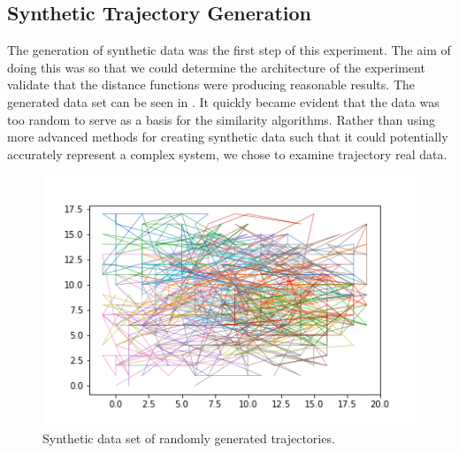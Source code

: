 



\subsection{Synthetic Trajectory Generation}



The generation of synthetic data was the first step of this experiment. 
The aim of doing this  was so that we could determine the architecture of the experiment validate that the distance functions were producing reasonable results.  
The generated data set can be seen in . 
It quickly became evident that the data was too random to serve as a basis for the similarity algorithms.
Rather than using more advanced methods for creating synthetic data such that it could potentially accurately represent a complex system, we chose to examine trajectory real data.
 


\begin{figure}
\centering
\includegraphics[width=.7\textwidth]{figs/traj/SYNTHETIC.png}
\caption{Synthetic data set of randomly generated trajectories.}
\label{fig:synthetic-data}
\end{figure}



